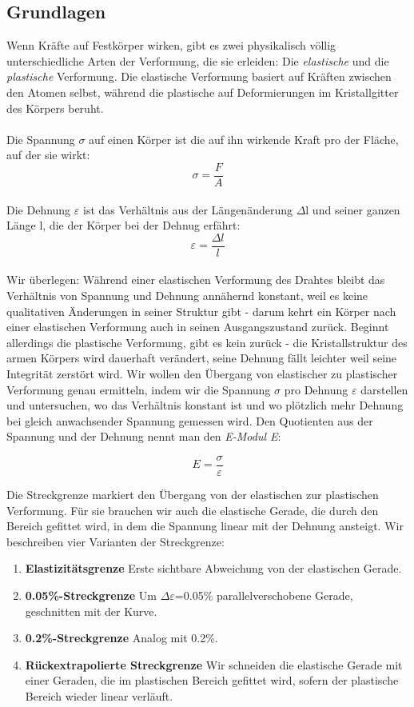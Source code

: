 \documentclass{article}
\begin{document}
\subsection{Grundlagen}
Wenn Kräfte auf Festkörper wirken, gibt es zwei physikalisch völlig unterschiedliche Arten der Verformung, die sie erleiden: Die \textit{elastische} und die \textit{plastische} Verformung. Die elastische Verformung basiert auf Kräften zwischen den Atomen selbst, während die plastische auf Deformierungen im Kristallgitter des Körpers beruht. \\
\\Die Spannung $\sigma$ auf einen Körper ist die auf ihn wirkende Kraft pro der Fläche, auf der sie wirkt:  $$ \sigma = \frac{F}{A} $$ \\
Die Dehnung  $\varepsilon$ ist das Verhältnis aus der Längenänderung $\Delta$l und seiner ganzen Länge l, die der Körper bei der Dehnug erfährt: \\
$$ \varepsilon= \frac{\Delta l}{l} $$ \\
 Wir überlegen: Während einer elastischen Verformung des Drahtes bleibt das Verhältnis von Spannung und Dehnung annähernd konstant, weil es keine qualitativen Änderungen in seiner Struktur gibt - darum kehrt ein Körper nach einer elastischen Verformung auch in seinen Ausgangszustand zurück. Beginnt allerdings die plastische Verformung, gibt es kein zurück - die Kristallstruktur des armen Körpers wird dauerhaft verändert, seine Dehnung fällt leichter weil seine Integrität zerstört wird. Wir wollen den Übergang von elastischer zu plastischer Verformung genau ermitteln, indem wir die Spannung $\sigma$ pro Dehnung $\varepsilon$ darstellen und untersuchen, wo das Verhältnis konstant ist und wo plötzlich mehr Dehnung bei gleich anwachsender Spannung gemessen wird. Den Quotienten aus der Spannung und der Dehnung nennt man den \textit{E-Modul E}:

$$ E=\frac{\sigma}{\varepsilon}$$

Die Streckgrenze markiert den Übergang von der elastischen zur plastischen Verformung. Für sie brauchen wir auch die elastische Gerade, die durch den Bereich gefittet wird, in dem die Spannung linear mit der Dehnung ansteigt. Wir beschreiben vier Varianten der Streckgrenze:
\begin{enumerate}
\item \textbf{Elastizitätsgrenze} Erste sichtbare Abweichung von der elastischen Gerade.
\item \textbf{0.05\%-Streckgrenze} Um $\Delta \varepsilon$=0.05\% parallelverschobene Gerade, geschnitten mit der Kurve.
\item \textbf{0.2\%-Streckgrenze} Analog mit 0.2\%.
\item \textbf{Rückextrapolierte Streckgrenze} Wir schneiden die elastische Gerade mit einer Geraden, die im plastischen Bereich gefittet wird, sofern der plastische Bereich wieder linear verläuft.
\end{enumerate}
\end{document}
